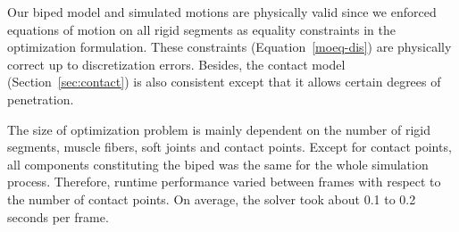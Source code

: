 \documentclass[master,english,final]{kaist-ucs}
\begin{document}
Our biped model and simulated motions are physically valid since
we enforced equations of motion on all rigid segments
as equality constraints in the optimization formulation.
These constraints (Equation~\eqref{moeq-dis})
are physically correct up to discretization errors.
Besides, the contact model (Section~\ref{sec:contact}) is also consistent
except that it allows certain degrees of penetration.

The size of optimization problem is mainly
dependent on the number of rigid segments, muscle fibers, soft joints
and contact points. Except for contact points, all components
constituting the biped was the same for the whole simulation process.
Therefore, runtime performance varied between frames
with respect to the number of contact points. On average, the solver took
about 0.1 to 0.2 seconds per frame.








\end{document}
